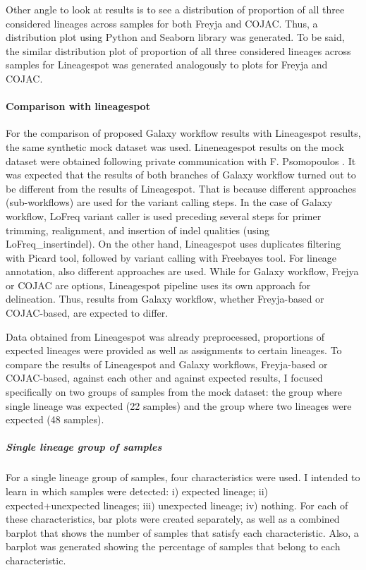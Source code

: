                 Other angle to look at results is to see a distribution of proportion of all three considered lineages across samples for both Freyja and COJAC. Thus, a distribution plot using Python and Seaborn library was generated. To be said, the similar distribution plot of proportion of all three considered lineages across samples for Lineagespot was generated analogously to plots for Freyja and COJAC.

                
            \paragraph{Comparison with lineagespot} \label{sec:methods:evaluation:mock:compare-ls}
            For the comparison of proposed Galaxy workflow results with Lineagespot results, the same synthetic mock dataset was used. Lineneagespot results on the mock dataset were obtained following private communication with F. Psomopoulos \cite{pechlivanis2022}. It was expected that the results of both branches of Galaxy workflow turned out to be different from the results of Lineagespot. That is because different approaches (sub-workflows) are used for the variant calling steps. In the case of Galaxy workflow, LoFreq variant caller is used preceding several steps for primer trimming, realignment, and insertion of indel qualities (using LoFreq\_insertindel). On the other hand, Lineagespot uses duplicates filtering with Picard tool, followed by variant calling with Freebayes tool. For lineage annotation, also different approaches are used. While for Galaxy workflow, Frejya or COJAC are options, Lineagespot pipeline uses its own approach for delineation. Thus, results from Galaxy workflow, whether Freyja-based or COJAC-based, are expected to differ.

            Data obtained from Lineagespot was already preprocessed, proportions of expected lineages were provided as well as assignments to certain lineages. To compare the results of Lineagespot and Galaxy workflows, Freyja-based or COJAC-based, against each other and against expected results, I focused specifically on two groups of samples from the mock dataset: the group where single lineage was expected (22 samples) and the group where two lineages were expected (48 samples). 

            
                \subparagraph{Single lineage group of samples} 
                For a single lineage group of samples, four characteristics were used. I intended to learn in which samples were detected: i) expected lineage; ii) expected+unexpected lineages; iii) unexpected lineage; iv) nothing. For each of these characteristics, bar plots were created separately, as well as a combined barplot that shows the number of samples that satisfy each characteristic. Also, a barplot was generated showing the percentage of samples that belong to each characteristic.

